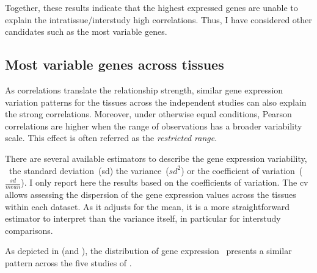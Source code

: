 Together, these results indicate
that the highest expressed genes are unable to explain
the intratissue/interstudy high correlations.
Thus, I have considered other candidates
such as the most variable genes.


\subsection{Most variable genes across tissues}
As correlations translate the relationship strength,
similar gene expression variation patterns for the tissues
across the independent studies can also explain the strong correlations.
Moreover, under otherwise equal conditions,
Pearson correlations are higher
when the range of observations has a broader variability scale.
This effect is often referred as
the \emph{restricted range}.~

There are several available estimators to describe the gene expression variability,
\eg\ the standard deviation~(sd) the variance~($sd^2$) or the coefficient of
variation~($\frac{sd}{mean}$).
I only report here the results based on the coefficients of variation.
The \gls{cv} allows assessing
the dispersion of the gene expression values
across the tissues within each dataset.
As it adjusts for the mean,
it is a more straightforward estimator to interpret than
the variance itself,
in particular for interstudy comparisons.

\begin{comment}
Visualising the \gls{cv} distribution of
gene expression for the working set \setOne\ (see \Cref{fig:HistCV4T})
allows determining whether they are similar across the five transcriptomic studies
or that inferring conclusions requires more cautions.
\end{comment}
As depicted in  (and ),
the distribution of gene expression \cvs\ presents a similar pattern
across the five studies of \setOne.

